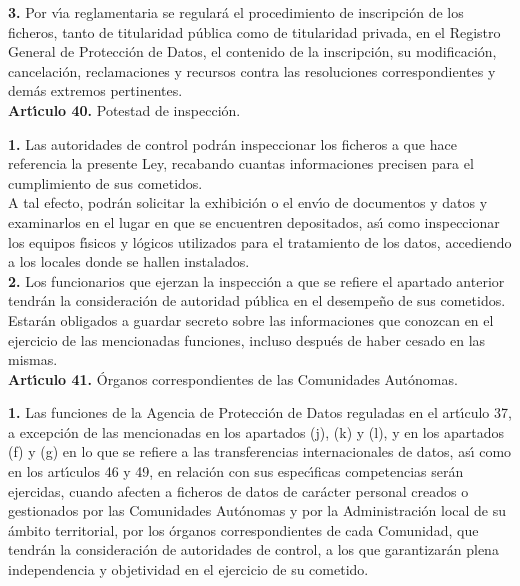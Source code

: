 {\bf 3.} Por v\'{\i}a reglamentaria se regular\'a el procedimiento de 
inscripci\'on de los ficheros, tanto de titularidad p\'ublica como de 
titularidad privada, en el Registro General de Protecci\'on de Datos, el 
contenido de la inscripci\'on, su modificaci\'on, cancelaci\'on, reclamaciones 
y recursos contra las resoluciones correspondientes y dem\'as extremos 
pertinentes.
\vspace{0.3cm}\\
{\large {\bf Art\'{\i}culo 40.} Potestad de inspecci\'on.}

{\bf 1.} Las autoridades de control podr\'an inspeccionar los ficheros a que 
hace referencia la presente Ley, recabando cuantas informaciones precisen para 
el cumplimiento de sus cometidos.\\
A tal efecto, podr\'an solicitar la exhibici\'on o el env\'{\i}o de documentos 
y datos y examinarlos en el lugar en que se encuentren depositados, as\'{\i} 
como inspeccionar los equipos f\'{\i}sicos y l\'ogicos utilizados para el 
tratamiento de los datos, accediendo a los locales donde se hallen instalados.\\

{\bf 2.} Los funcionarios que ejerzan la inspecci\'on a que se refiere el 
apartado anterior tendr\'an la consideraci\'on de autoridad p\'ublica en el 
desempe\~no de sus cometidos.\\
Estar\'an obligados a guardar secreto sobre las informaciones que conozcan en 
el ejercicio de las mencionadas funciones, incluso despu\'es de haber cesado en 
las mismas.
\vspace{0.3cm}\\
{\large {\bf Art\'{\i}culo 41.} \'Organos correspondientes de las Comunidades 
Aut\'onomas.}

{\bf 1.} Las funciones de la Agencia de Protecci\'on de Datos reguladas en el 
art\'{\i}culo 37, a excepci\'on de las mencionadas en los apartados (j), (k) y 
(l), y en los apartados (f) y (g) en lo que se refiere a las transferencias 
internacionales de datos, as\'{\i} como en los art\'{\i}culos 46 y 49, en 
relaci\'on con sus espec\'{\i}ficas competencias ser\'an ejercidas, cuando 
afecten a ficheros de datos de car\'acter personal creados o gestionados por 
las Comunidades Aut\'onomas y por la Administraci\'on local de su \'ambito 
territorial, por los \'organos correspondientes de cada Comunidad, que 
tendr\'an la consideraci\'on de autoridades de control, a los que 
garantizar\'an plena independencia y objetividad en el ejercicio de su 
cometido.\\

